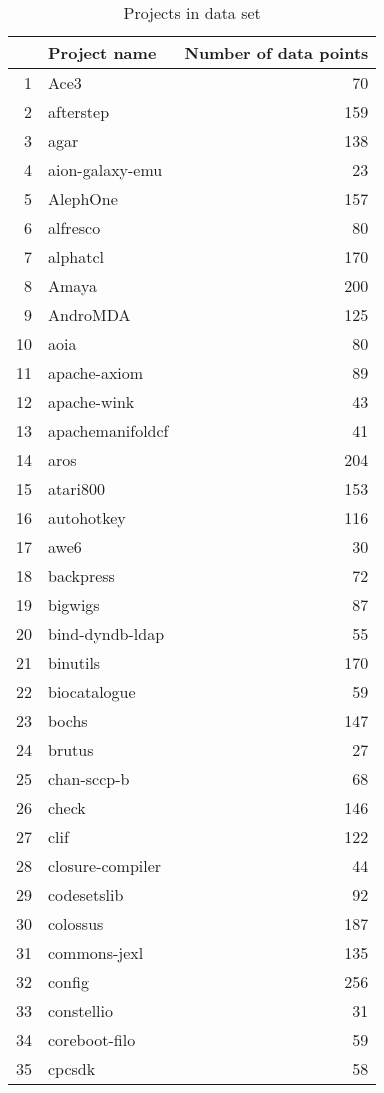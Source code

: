 \begin{table}[ht]
\caption{Projects in data set}\label{table:projects}
\centering
\begin{tabular}{rlr}
  \hline
 & Project name & Number of data points \\ 
  \hline
1 & Ace3 &  70 \\ 
  2 & afterstep & 159 \\ 
  3 & agar & 138 \\ 
  4 & aion-galaxy-emu &  23 \\ 
  5 & AlephOne & 157 \\ 
  6 & alfresco &  80 \\ 
  7 & alphatcl & 170 \\ 
  8 & Amaya & 200 \\ 
  9 & AndroMDA & 125 \\ 
  10 & aoia &  80 \\ 
  11 & apache-axiom &  89 \\ 
  12 & apache-wink &  43 \\ 
  13 & apachemanifoldcf &  41 \\ 
  14 & aros & 204 \\ 
  15 & atari800 & 153 \\ 
  16 & autohotkey & 116 \\ 
  17 & awe6 &  30 \\ 
  18 & backpress &  72 \\ 
  19 & bigwigs &  87 \\ 
  20 & bind-dyndb-ldap &  55 \\ 
  21 & binutils & 170 \\ 
  22 & biocatalogue &  59 \\ 
  23 & bochs & 147 \\ 
  24 & brutus &  27 \\ 
  25 & chan-sccp-b &  68 \\ 
  26 & check & 146 \\ 
  27 & clif & 122 \\ 
  28 & closure-compiler &  44 \\ 
  29 & codesetslib &  92 \\ 
  30 & colossus & 187 \\ 
  31 & commons-jexl & 135 \\ 
  32 & config & 256 \\ 
  33 & constellio &  31 \\ 
  34 & coreboot-filo &  59 \\ 
  35 & cpcsdk &  58 \\ 

\end{tabular}
\end{table}
